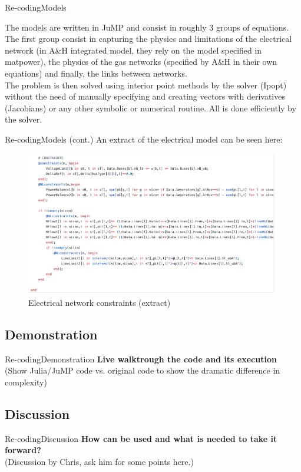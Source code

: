 \documentclass[handout]{beamer}
\begin{document}
\begin{frame}[t]{Re-coding}{Models}

  The models are written in JuMP and consist in roughly 3 groups of equations. The first group consist in capturing the physics and limitations of the electrical network (in A\&H integrated model, they rely on the model specified in matpower), the physics of the gas networks (specified by A\&H in their own equations) and finally, the links between networks.\\[6pt]

  The problem is then solved using interior point methods by the solver (Ipopt) without the need of manually specifying and creating vectors with derivatives (Jacobians) or any other symbolic or numerical routine. All is done efficiently by the solver.
\end{frame}

\begin{frame}[t]{Re-coding}{Models (cont.)}
  An extract of the electrical model can be seen here:

  \begin{figure}
  \begin{center}
  \includegraphics[height=0.55\textheight]{OPF2.png}
  \end{center}
  \caption{Electrical network constraints (extract)}\label{fig:opf}
  \end{figure}

\end{frame}


\subsection{Demonstration}

  \begin{frame}{Re-coding}{Demonstration}
    \textbf{Live walktrough the code and its execution}\\[12pt]
    (Show Julia/JuMP code vs. original code to show the dramatic difference in complexity)
  \end{frame}

\subsection{Discussion}
\begin{frame}{Re-coding}{Discussion}
  \textbf{How can be used and what is needed to take it forward?}\\[12pt]
  (Discussion by Chris, ask him for some points here.)

\end{frame}
\end{document}

